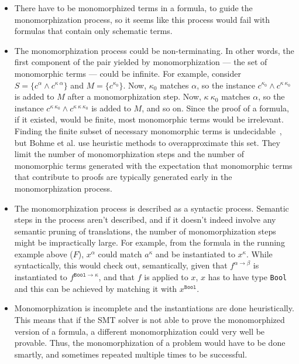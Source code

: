 \documentclass{article}
\begin{document}
	\begin{itemize}
		\item There have to be monomorphized 
		terms in a formula, to guide the 
		monomorphization process, so it 
		seems like this process would 
		fail with formulas that contain 
		only schematic terms. 
		\item The monomorphization process 
		could be non-terminating. In 
		other words, the first component
		of the pair yielded by 
		monomorphization --- the 
		set of monomorphic terms ---
		could be infinite. For example,
		consider $S = \{c^{\alpha}
		\land c^{\kappa\ \alpha}\}$
		and $M = \{c^{\kappa_0}\}$.
		Now, $\kappa_0$ matches 
		$\alpha$, so the instance
		$c^{\kappa_0} \land 
		c^{\kappa\ \kappa_0}$ is added 
		to $M$ after a monomorphization 
		step. Now, $\kappa\ \kappa_0$
		matches $\alpha$, so the 
		instance $c^{\kappa\ \kappa_0} 
		\land c^{\kappa\ \kappa\ 
			\kappa_0}$ is added to $M$, 
		and so on. Since the proof of a 
		formula, if it existed, would 
		be finite, most monomorphic 
		terms would be irrelevant. 
		Finding the finite subset of 
		necessary monomorphic terms is 
		undecidable~\cite{10.1007/978-3-642-24364-6_7},
		but Bohme et al. use heuristic
		methods to overapproximate
		this set. They limit the 
		number of monomorphization 
		steps and the number of 
		monomorphic terms generated
		with the expectation that 
		monomorphic terms that 
		contribute to proofs 
		are typically generated early 
		in the monomorphization process.
		\item The monomorphization process
		is described as a syntactic 
		process. Semantic steps in 
		the process aren't described, 
		and if it doesn't indeed 
		involve	any semantic pruning of 
		translations, the number of 
		monomorphization steps 
		might be impractically large. 
		For example, from the formula 
		in the running example above ($F$), 
		$x^{\alpha}$ could match 
		$a^{\kappa}$ and be instantiated 
		to $x^{\kappa}$. While 
		syntactically, this would 
		check out, semantically, 
		given that $f^{\alpha \to \beta}$
		is instantiated to 
		$f^{\texttt{Bool} \to \kappa}$, 
		and that $f$ is applied to $x$, 
		$x$ has to have type 
		\texttt{Bool} and this can be 
		achieved by matching it with 
		$x^{\texttt{Bool}}$.
		\item Monomorphization is 
		incomplete and the instantiations 
		are done heuristically. This 
		means that if the SMT solver 
		is not able to prove the 
		monomorphized version of a 
		formula, a different 
		monomorphization could 
		very well be provable. Thus, 
		the monomorphization of a 
		problem would have to be 
		done smartly, and sometimes
		repeated multiple times to 
		be successful. 
	\end{itemize} 
	
\end{document}
